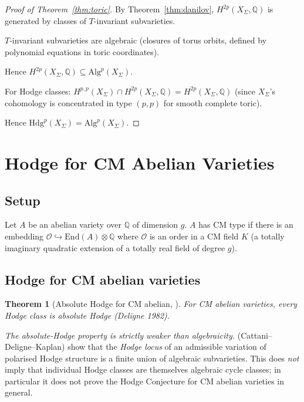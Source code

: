\documentclass[11pt, a4paper]{amsart}
\newtheorem{theorem}{Theorem}[section]
\theoremstyle{definition}
\newcommand{\Q}{\mathbb{Q}}
\begin{document}
\begin{proof}[Proof of Theorem~\ref{thm:toric}]
By Theorem~\ref{thm:danilov}, $H^{2p}(X_\Sigma, \Q)$ is generated by
classes of $T$-invariant subvarieties.

$T$-invariant subvarieties are algebraic (closures of torus orbits,
defined by polynomial equations in toric coordinates).

Hence $H^{2p}(X_\Sigma, \Q) \subseteq \mathrm{Alg}^p(X_\Sigma)$.

For Hodge classes: $H^{p,p}(X_\Sigma) \cap H^{2p}(X_\Sigma, \Q) =
H^{2p}(X_\Sigma, \Q)$ (since $X_\Sigma$'s cohomology is concentrated
in type $(p, p)$ for smooth complete toric).

Hence $\mathrm{Hdg}^p(X_\Sigma) = \mathrm{Alg}^p(X_\Sigma)$.
\end{proof}

\section{Hodge for CM Abelian Varieties}\label{sec:abelian}

\subsection{Setup}

Let $A$ be an abelian variety over $\Q$ of dimension $g$. $A$ has CM
type if there is an embedding $\mathcal{O} \hookrightarrow \mathrm{End}(A) \otimes \Q$
where $\mathcal{O}$ is an order in a CM field $K$ (a totally imaginary
quadratic extension of a totally real field of degree $g$).

\subsection{Hodge for CM abelian varieties}

\begin{theorem}[Absolute Hodge for CM abelian, \cite{Deligne1982}]
\label{thm:CMabs}
For CM abelian varieties, every Hodge class is absolute Hodge
(Deligne 1982).
\end{theorem}

\emph{The absolute-Hodge property is strictly weaker than
algebraicity.} \cite{CDK1995} (Cattani--Deligne--Kaplan) show that
the \emph{Hodge locus} of an admissible variation of polarised
Hodge structure is a finite union of algebraic subvarieties. This
does \emph{not} imply that individual Hodge classes are
themselves algebraic cycle classes; in particular it does not
prove the Hodge Conjecture for CM abelian varieties in general.
\end{document}
